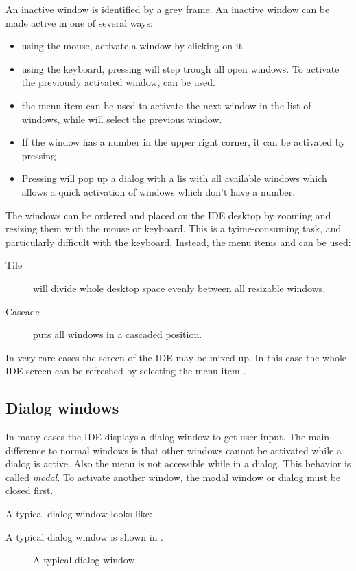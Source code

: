 An inactive window is identified by a grey frame. An inactive window can
be made active in one of several ways:
\begin{itemize}
\item using the mouse, activate a window by clicking on it.
\item using the keyboard, pressing  will step trough all open 
windows. To activate the previously activated window,  can
be used.
\item the menu item  can be used to activate the next 
window in the list of windows, while  will select
the previous window.
\item If the window has a number in the upper right corner, it can be
activated by pressing .
\item Pressing  will pop up a dialog with a lis  with all 
available windows which allows a quick activation of windows which 
don't have a number.
\end{itemize}

The windows can be ordered and placed on the IDE desktop by zooming and
resizing them with the mouse or keyboard. This is a tyime-consuming task, 
and particularly difficult with the keyboard. Instead, the menu items
 and  can be used:
\begin{description}
\item[Tile] will divide whole desktop space evenly between all resizable 
windows. 
\item[Cascade] puts all windows in a cascaded position. 
\end{description}

In very rare cases the screen of the IDE may be mixed up. In this
case the whole IDE screen can be refreshed by selecting the menu item 
.
%
%
\subsection{Dialog windows}
\label{se:dialogwindow}
In many cases the IDE displays a dialog window to get user input.
The main difference to normal windows is that other windows cannot be
activated while a dialog is active. Also the menu is not accessible while in
a dialog. This behavior is called \emph{modal}. To activate another window, 
the modal window or dialog must be closed first.

\begin{htmlonly}
A typical dialog window looks like:
\end{htmlonly}
\begin{latexonly}
A typical dialog window is shown in .
\begin{figure}
\caption{A typical dialog window}
\label{fig:idedlg}
\ifpdf
{}
\else
{}
\fi
\end{figure}
\end{latexonly}

